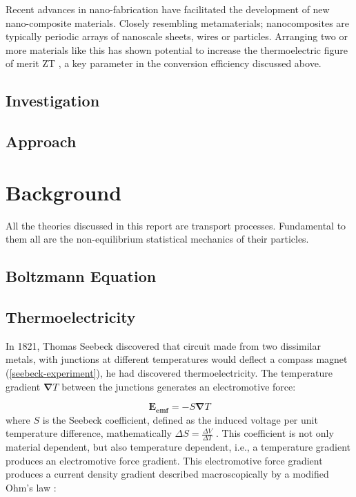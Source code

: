 \documentclass[12pt,titlepage,draft]{article}
\renewcommand{\vec}[1]{\mathbf{#1}}
\begin{document}
Recent advances in nano-fabrication have facilitated the development of  new nano-composite materials. Closely resembling metamaterials; nanocomposites are typically periodic arrays of nanoscale sheets, wires or particles. Arranging two or more materials like this has shown potential to increase the thermoelectric figure of merit ZT \cite{nanocomposite-zt}, a key parameter in the conversion efficiency discussed above.

\subsection{Investigation}

\subsection{Approach}

\section{Background}
All the theories discussed in this report are transport processes. Fundamental to them all are the non-equilibrium statistical mechanics of their particles.

\subsection{Boltzmann Equation}

\subsection{Thermoelectricity}
In 1821, Thomas Seebeck discovered that circuit made from two dissimilar metals, with junctions at different temperatures would deflect a compass magnet (\ref{seebeck-experiment}), he had discovered thermoelectricity. The temperature gradient $\vec{\nabla} T$ between the junctions generates an electromotive force:

\begin{equation}
\label{seebeck-emf}
	\vec{E_{emf}} = -S \vec{\nabla} T
\end{equation}
where $S$ is the Seebeck coefficient, defined as the induced voltage per unit temperature difference, mathematically $\Delta S = \frac{\Delta V}{\Delta T}$ \cite{auparay}. This coefficient is not only material dependent, but also temperature dependent, i.e., a temperature gradient produces an electromotive force gradient. This electromotive force gradient produces a current density gradient described macroscopically by a modified Ohm's law \cite{ziman}:
\end{document}
